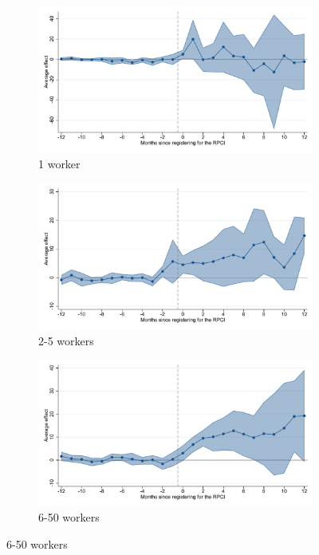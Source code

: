 \begin{figure}[H]
    \begin{subfigure}{0.32\textwidth}
    \caption{1 worker}
    \includegraphics[width=\textwidth]{04_Figures/muestra_10porciento/event_study_sal_cierre_size_1_dcdh_connected.pdf}
    \end{subfigure}
    \begin{subfigure}{0.32\textwidth}
    \caption{2-5 workers}
    \includegraphics[width=\textwidth]{04_Figures/muestra_10porciento/event_study_sal_cierre_size_2_dcdh_connected.pdf}
    \end{subfigure}
    \begin{subfigure}{0.32\textwidth}
    \caption{6-50 workers}
    \includegraphics[width=\textwidth]{04_Figures/muestra_10porciento/event_study_sal_cierre_size_6_dcdh_connected.pdf}
    \end{subfigure}
    
\end{figure}

